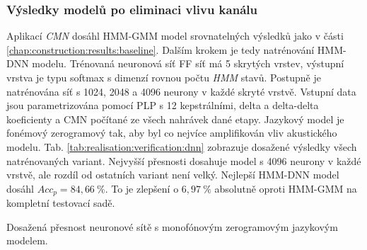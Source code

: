 \subsubsection{Výsledky modelů po eliminaci vlivu kanálu}

Aplikací \textit{CMN} dosáhl HMM-GMM model srovnatelných výsledků jako v části \ref{chap:construction:results:baseline}. Dalším krokem je tedy natrénování HMM-DNN modelu.
Trénovaná neuronová síť FF síť má 5 skrytých vrstev, výstupní vrstva je typu softmax s dimenzí rovnou počtu \textit{HMM} stavů. Postupně je natrénována síť s 1024, 2048 a 4096 neurony v každé skryté vrstvě. Vstupní data jsou parametrizována pomocí PLP s 12 kepstrálními, delta a delta-delta koeficienty a CMN počítané ze všech nahrávek dané etapy. Jazykový model je fonémový zerogramový tak, aby byl co nejvíce amplifikován vliv akustického modelu. Tab. \ref{tab:realisation:verification:dnn} zobrazuje dosažené výsledky všech natrénovaných variant. Nejvyšší přesnosti dosahuje model s 4096 neurony v každé vrstvě, ale rozdíl od ostatních variant není velký. Nejlepší HMM-DNN model dosáhl $Acc_{p} = 84,66\ \%$. To je zlepšení o $6,97\ \%$ absolutně oproti HMM-GMM na kompletní testovací sadě.

\begin{table}[htpb]
  \centering
  \def\arraystretch{1.5}
  \caption{Dosažená přesnost neuronové sítě s monofónovým zerogramovým jazykovým modelem.}
  \label{tab:realisation:verification:dnn}
\end{table}

